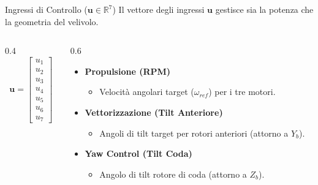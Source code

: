 \documentclass[aspectratio=169]{beamer} %
\begin{document}
\begin{frame}{Ingressi di Controllo ($\mathbf{u} \in \mathbb{R}^7$)}
    Il vettore degli ingressi $\mathbf{u}$ gestisce sia la potenza che la geometria del velivolo.

    \vspace{0.5cm}
    \begin{columns}[c]
        \begin{column}{0.4\textwidth}
            \centering
            \begin{equation*}
                \mathbf{u} = \begin{bmatrix} 
                u_1 \\ u_2 \\ u_3 \\ \hline
                u_4 \\ u_5 \\ u_6 \\ \hline
                u_7 
                \end{bmatrix}
            \end{equation*}
        \end{column}

        \begin{column}{0.6\textwidth}
            \begin{itemize}
                \item[] \textbf{Propulsione (RPM)}
                \begin{itemize}
                    \item[$u_{1-3}$:] Velocità angolari target ($\omega_{ref}$) per i tre motori.
                \end{itemize}
                \vspace{0.3cm}
                \item[] \textbf{Vettorizzazione (Tilt Anteriore)}
                \begin{itemize}
                    \item[$u_{4-6}$:] Angoli di tilt target per rotori anteriori (attorno a $Y_b$).
                \end{itemize}
                \vspace{0.3cm}
                \item[] \textbf{Yaw Control (Tilt Coda)}
                \begin{itemize}
                    \item[$u_7$:] Angolo di tilt rotore di coda (attorno a $Z_b$).
                \end{itemize}
            \end{itemize}
        \end{column}
    \end{columns}
\end{frame}
\end{document}
